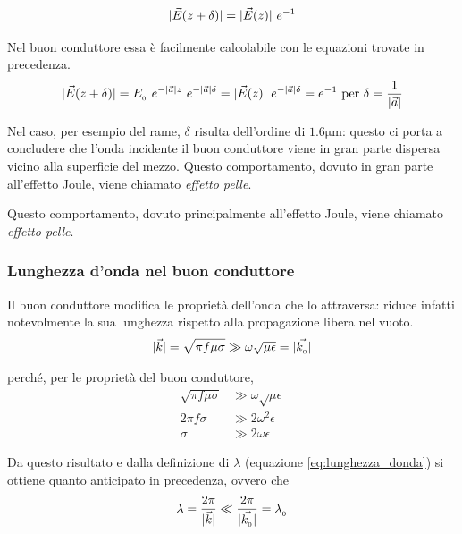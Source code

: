 		\begin{equation*}
			|\vec{E}(z + \delta)| = |\vec{E}(z)| ~ e^{-1}
		\end{equation*}

		Nel buon conduttore essa è facilmente calcolabile con le equazioni trovate in precedenza.
		\begin{equation} \begin{split} \label{eq:spessore_penetrazione}
			|\vec{E}(z + \delta)| = E_{_{0}} ~ e^{-|\vec{a}| z} ~ e^{-|\vec{a}| \delta} = |\vec{E}(z)| ~ e^{-|\vec{a}| \delta} = e^{-1} \text{ per } \delta = \frac{1}{|\vec{a}|}
		\end{split} \end{equation}

		Nel caso, per esempio del rame, $\delta$ risulta dell'ordine di $1.6 \mathrm{\mu m}$: questo ci porta a concludere che l'onda incidente il buon conduttore viene in gran parte dispersa vicino alla superficie del mezzo.
		Questo comportamento, dovuto in gran parte all'effetto Joule, viene chiamato \emph{effetto pelle}.

		Questo comportamento, dovuto principalmente all'effetto Joule, viene chiamato \emph{effetto pelle}.
		\subsubsection{Lunghezza d'onda nel buon conduttore}
		Il buon conduttore modifica le proprietà dell'onda che lo attraversa: riduce infatti notevolmente la sua lunghezza rispetto alla propagazione libera nel vuoto.
		\begin{equation*} \begin{split}
			& |\vec{k}|
				= \sqrt{\pi f \mu \sigma}
				\gg \omega \sqrt{\mu \epsilon}
				= |\vec{k_{_{0}}}| \\
		\end{split} \end{equation*}

		perché, per le proprietà del buon conduttore,
		\begin{equation*} \begin{split}
				\sqrt{\pi f \mu \sigma} &\gg \omega \sqrt{\mu \epsilon} \\
				2 \pi f \sigma &\gg 2 \omega^2 \epsilon \\
				\sigma &\gg 2 \omega \epsilon
		\end{split} \end{equation*}

		Da questo risultato e dalla definizione di $\lambda$ (equazione \eqref{eq:lunghezza_donda}) si ottiene quanto anticipato in precedenza, ovvero che
		\begin{equation*} \begin{split}
			& \lambda = \frac{2\pi}{|\vec{k}|} \ll \frac{2\pi}{|\vec{k_{_{0}}}|} = \lambda_{_{0}} \\
		\end{split} \end{equation*}

